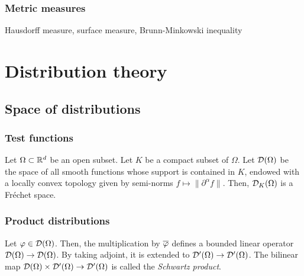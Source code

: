\documentclass{../../large}
\begin{document}
\section{Metric measures}

Hausdorff measure, surface measure, Brunn-Minkowski inequality









\part{Distribution theory}

\chapter{Space of distributions}
\section{Test functions}

\begin{prb}
Let $\Omega\subset\mathbb{R}^d$ be an open subset.
Let $K$ be a compact subset of $\Omega$.
Let $\mathcal{D}(\Omega)$ be the space of all smooth functions whose support is contained in $K$, endowed with a locally convex topology given by semi-norms $f\mapsto\|\partial^\alpha f\|$.
Then, $\mathcal{D}_K(\Omega)$ is a Fr\'echet space.

\end{prb}





\section{Product distributions}




\begin{prb}
\end{prb}

\begin{prb}[Translation?]
\end{prb}
\begin{prb}
Let $\varphi\in\mathcal{D}(\Omega)$.
Then, the multiplication by $\overline{\varphi}$ defines a bounded linear operator $\mathcal{D}(\Omega)\to\mathcal{D}(\Omega)$.
By taking adjoint, it is extended to $\mathcal{D}'(\Omega)\to\mathcal{D}'(\Omega)$.
The bilinear map $\mathcal{D}(\Omega)\times\mathcal{D}'(\Omega)\to\mathcal{D}'(\Omega)$ is called the \emph{Schwartz product}.
\end{prb}
\end{document}
